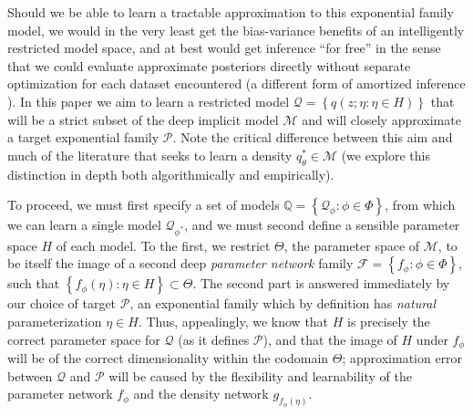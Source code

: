 \documentclass{article}
\begin{document}
 Should we be able to learn a tractable approximation to this exponential family model, we would in the very least get the bias-variance benefits of an intelligently restricted model space, and at best would get inference ``for free'' in the sense that we could evaluate approximate posteriors directly without separate optimization for each dataset encountered (a different form of amortized inference \cite{gershman2014amortized,Kingma:2013aa,rezende2014stochastic,stuhlmuller2013learning}).  
 In this paper we aim to learn a restricted model $\mathcal{Q} = \left\{ q(z; \eta: \eta \in H)\right\}$ that will be a strict subset of the deep implicit model $\mathcal{M}$ and will closely approximate a target exponential family $\mathcal{P}$.  
 Note the critical difference between this aim and much of the literature that seeks to learn a density $q_{\theta}^* \in \mathcal{M}$ (we explore this distinction in depth both algorithmically and empirically).  
 
To proceed, we must first specify a set of models $\mathbb{Q} = \left\{ \mathcal{Q}_\phi : \phi \in \Phi \right\}$, from which we can learn a single model $\mathcal{Q}_{\phi^*}$, and we must second define a sensible parameter space $H$ of each model.  
To the first, we restrict $\Theta$, the parameter space of $\mathcal{M}$, to be itself the image of a second deep \emph{parameter network} family $\mathcal{F} = \left\{f_\phi : \phi \in \Phi\right\}$, such that $\left\{ f_\phi(\eta) : \eta \in H \right\} \subset \Theta$.
The second part is answered immediately by our choice of target $\mathcal{P}$, an exponential family which by definition has \emph{natural} parameterization $\eta \in H$.  
Thus, appealingly, we know that $H$ is precisely the correct parameter space for $\mathcal{Q}$ (as it defines $\mathcal{P}$), and that the image of $H$ under $f_\phi$ will be of the correct dimensionality within the codomain $\Theta$; approximation error between $\mathcal{Q}$ and $\mathcal{P}$ will be caused by the flexibility and learnability of the parameter network $f_\phi$ and the density network $g_{f_{\phi}(\eta)}$.  
\end{document}
